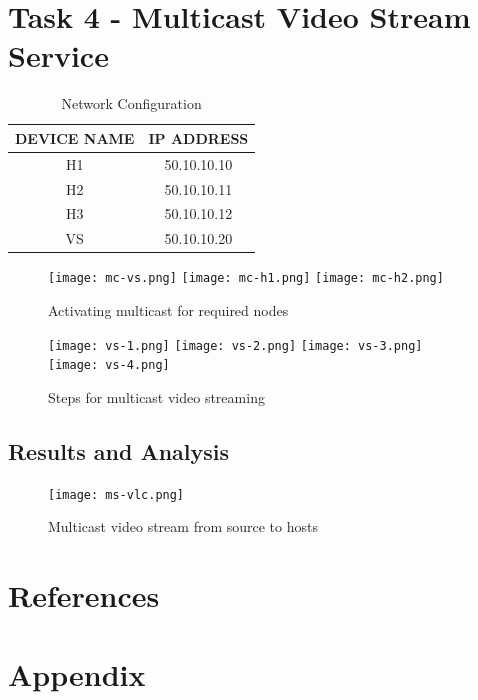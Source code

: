 \documentclass{article}
\begin{document}
\newpage
\section{Task 4 - Multicast Video Stream Service}
    	\begin{table}[h]
        		\centering
        		\begin{tabular}{|c|c|}
            		\hline
            		DEVICE NAME & IP ADDRESS \\
            		\hline
            		H1 & 50.10.10.10 \\
            		H2 & 50.10.10.11 \\
            		H3 & 50.10.10.12 \\
            		VS & 50.10.10.20 \\
            		\hline
        		\end{tabular}
        		\caption{Network Configuration}
        		\label{tab:5}
    	\end{table}
    	\begin{figure}[h]
        		\centering
        		\texttt{[image: mc-vs.png]}
        		\texttt{[image: mc-h1.png]}
        		\texttt{[image: mc-h2.png]}
        		\caption{Activating multicast for required nodes}
        		\label{fig:t4-1}
    	\end{figure}
    	\begin{figure}[h]
        		\texttt{[image: vs-1.png]}
        		\texttt{[image: vs-2.png]}
        		\texttt{[image: vs-3.png]}
        		\texttt{[image: vs-4.png]}
        		\caption{Steps for multicast video streaming}
        		\label{fig:t4-2}
    	\end{figure}
    
\newpage    
\subsection{Results and Analysis}
	\begin{figure}[h]
		\centering
		\texttt{[image: ms-vlc.png]}
		\caption{Multicast video stream from source to hosts}
		\label{fig:t4-3}
	\end{figure}

\newpage
\section{References}



\newpage
\section{Appendix}
\end{document}

